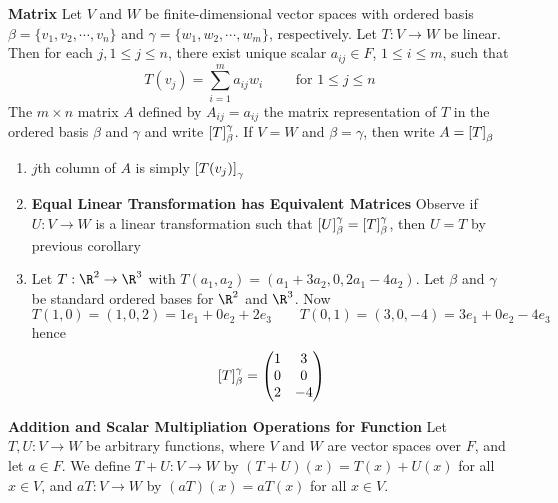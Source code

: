 \documentclass[11pt]{article}
\begin{document}
\begin{defn*}
    \textbf{Matrix} Let $V$ and $W$ be finite-dimensional vector spaces with ordered basis $\beta = \{v_1,v_2,\cdots, v_n\}$ and $\gamma = \{w_1,w_2,\cdots, w_m\}$, respectively. Let $T:V\to W$ be linear. Then for each $j, 1\leq j \leq n$, there exist unique scalar $a_{ij} \in F$, $1\leq i \leq m$, such that 
    \[
        T(v_j) = \sum_{i=1}^m a_{ij}w_i 
        \quad \quad 
        \text{ for } 1\leq j \leq n    
    \]
    The $m\times n$ matrix $A$ defined by $A_{ij}=a_{ij}$ the matrix representation of $T$ in the ordered basis $\beta$ and $\gamma$ and write $\left[ T \right]_{\beta}^{\gamma}$. If $V=W$ and $\beta=\gamma$, then write $A = \left[ T \right]_{\beta}$
    \begin{enumerate}
        \item $j$th column of $A$ is simply $\left[ T(v_j) \right]_{\gamma}$
        \item \textbf{Equal Linear Transformation has Equivalent Matrices} Observe if $U:V\to W$ is a linear transformation such that $\left[ U \right]_{\beta}^{\gamma}=  \left[ T \right]_{\beta}^{\gamma}$, then $U=T$ by previous corollary 
        \item Let $T:\R^2\to \R^3$ with $T(a_1,a_2) = (a_1+3a_2, 0, 2a_1-4a_2)$. Let $\beta$ and $\gamma$ be standard ordered bases for $\R^2$ and $\R^3$. Now 
        \[
            T(1,0)=(1,0,2)=1e_1 + 0e_2 + 2e_3 \quad \quad 
            T(0,1)=(3,0,-4)=3e_1+0e_2-4e_3    
        \]
        hence 
        \[            
            \left[ T \right]_{\beta}^{\gamma} = 
            \begin{pmatrix}
                1 & 3 \\
                0 & 0 \\
                2 & -4 \\ 
            \end{pmatrix}
        \]
    \end{enumerate}
\end{defn*}


\begin{defn*}
    \textbf{Addition and Scalar Multipliation Operations for Function} Let $T,U:V\to W$ be arbitrary functions, where $V$ and $W$ are vector spaces over $F$, and let $a\in F$. We define $T+U:V\to W$ by $(T+U)(x) = T(x)+U(x)$ for all $x\in V$, and $aT:V\to W$ by $(aT)(x) = aT(x)$ for all $x\in V$. 
\end{defn*}
\end{document}
